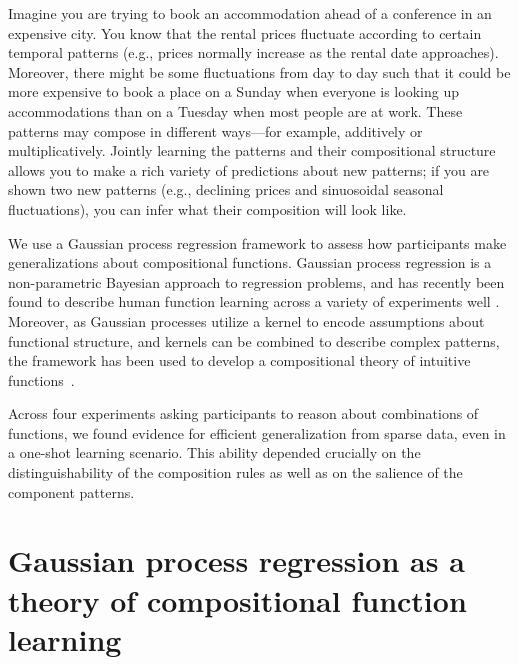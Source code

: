 \documentclass[10pt,letterpaper]{article}
\begin{document}
Imagine you are trying to book an accommodation ahead of a conference in an expensive city. You know that the rental prices fluctuate according to certain temporal patterns (e.g., prices normally increase as the rental date approaches). Moreover, there might be some fluctuations from day to day such that it could be more expensive to book a place on a Sunday when everyone is looking up accommodations than on a Tuesday when most people are at work. These patterns may compose in different ways---for example, additively or multiplicatively. Jointly learning the patterns and their compositional structure allows you to make a rich variety of predictions about new patterns; if you are shown two new patterns (e.g., declining prices and sinuosoidal seasonal fluctuations), you can infer what their composition will look like.

We use a Gaussian process regression framework to assess how participants make generalizations about compositional functions. Gaussian process regression is a non-parametric Bayesian approach to regression problems, and has recently been found to describe human function learning across a variety of experiments well \cite{lucas2015rational, griffiths2009modeling}. Moreover, as Gaussian processes utilize a kernel to encode assumptions about functional structure, and kernels can be combined to describe complex patterns, the framework has been used to develop a compositional theory of intuitive functions~\cite{schulz2016compositional, villagrahuman}.

Across four experiments asking participants to reason about combinations of functions, we found evidence for efficient generalization from sparse data, even in a one-shot learning scenario. This ability depended crucially on the distinguishability of the composition rules as well as on the salience of the component patterns.

\section{Gaussian process regression as a theory of compositional function learning}


\end{document}
